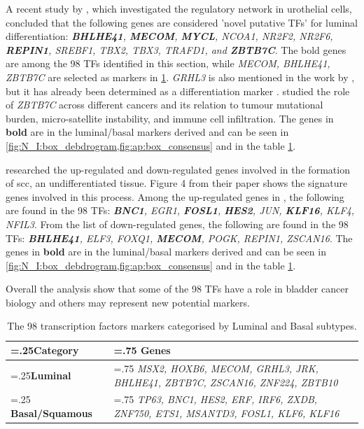 A recent study by \citet{Ramal2024-ha}, which investigated the regulatory network in urothelial cells, concluded that the following genes are considered 'novel putative TFs' for luminal differentiation: \textit{\textbf{BHLHE41}, \textbf{MECOM}, \textbf{MYCL}, NCOA1, NR2F2, NR2F6, \textbf{REPIN1}, SREBF1, TBX2, TBX3, TRAFD1, and \textbf{ZBTB7C}}. The bold genes are among the 98 TFs identified in this section, while \textit{MECOM, BHLHE41, ZBTB7C} are selected as markers in \cref{tab:N_I:genes_lum_basal}. \textit{GRHL3} is also mentioned in the work by \citet{Ramal2024-ha}, but it has already been determined as a differentiation marker \citep{Bock2014-zy}. \citet{Chen2021-tc} studied the role of \textit{ZBTB7C} across different cancers and its relation to tumour mutational burden, micro-satellite instability, and immune cell infiltration. The genes in \textbf{bold} are in the luminal/basal markers derived and can be seen in \cref{fig:N_I:box_debdrogram,fig:ap:box_consensus} and in the table \cref{tab:N_I:genes_lum_basal}.

\citet{Hurst2022-sp} researched the up-regulated and down-regulated genes involved in the formation of \acrfull{scc}, an undifferentiated tissue. Figure 4 from their paper shows the signature genes involved in this process. Among the up-regulated genes in \citet{Hurst2022-sp}, the following are found in the 98 TFs: \textit{\textbf{BNC1}, EGR1, \textbf{FOSL1}, \textbf{HES2}, JUN, \textbf{KLF16}, KLF4, NFIL3}. From the list of down-regulated genes, the following are found in the 98 TFs: \textit{\textbf{BHLHE41}, ELF3, FOXQ1, \textbf{MECOM}, POGK, REPIN1, ZSCAN16}. The genes in \textbf{bold} are in the luminal/basal markers derived and can be seen in \cref{fig:N_I:box_debdrogram,fig:ap:box_consensus} and in the table \cref{tab:N_I:genes_lum_basal}.

% 
Overall the analysis show that some of the 98 TFs have a role in bladder cancer biology and others may represent new potential markers.

\begin{table}[!htb]
  \centering
  \small
  \begin{tabularx}{\textwidth}{>{\hsize=.25\hsize}X|>{\hsize=.75\hsize}X}
    \toprule
    \textbf{Category} & \textbf{Genes} \\
    \midrule
    \textbf{Luminal} & \textit{MSX2, HOXB6, MECOM, GRHL3, JRK, BHLHE41, ZBTB7C, ZSCAN16, ZNF224, ZBTB10} \\
    \midrule
    \textbf{Basal/Squamous} & \textit{TP63, BNC1, HES2, ERF, IRF6, ZXDB, ZNF750, ETS1, MSANTD3, FOSL1, KLF6, KLF16} \\
    \bottomrule
  \end{tabularx}
  \caption[Luminal and Basal markers from the 98 TFs]{The 98 transcription factors markers categorised by Luminal and Basal subtypes.} %
  \label{tab:N_I:genes_lum_basal}
\end{table}



